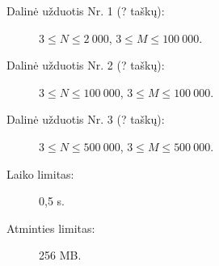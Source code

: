 \documentclass{boi2014-lt}
\begin{document}
    \Scoring

    \begin{description}
        \item[Dalinė užduotis Nr. 1 (? taškų):]
            $3 \le N \le 2\ 000$, $3 \le M \le 100\ 000$.
        \item[Dalinė užduotis Nr. 2 (? taškų):]
            $3 \le N \le 100\ 000$, $3 \le M \le 100\ 000$.
        \item[Dalinė užduotis Nr. 3 (? taškų):]
            $3 \le N \le 500\ 000$, $3 \le M \le 500\ 000$.
    \end{description}

    \Constraints

    \begin{description}
        \item[Laiko limitas:] 0,5 s.
        \item[Atminties limitas:] 256 MB.
    \end{description}
\end{document}

